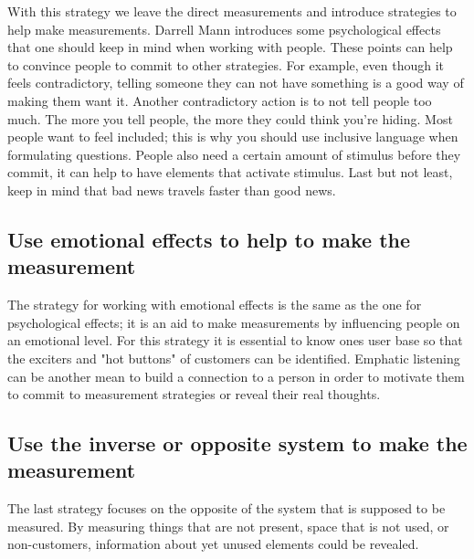 With this strategy we leave the direct measurements and introduce strategies to help make measurements.
Darrell Mann introduces some psychological effects that one should keep in mind when working with people.
These points can help to convince people to commit to other strategies.
For example, even though it feels contradictory, telling someone they can not have something is a good way of making them want it.
Another contradictory action is to not tell people too much.
The more you tell people, the more they could think you're hiding.
Most people want to feel included; this is why you should use inclusive language when formulating questions.
People also need a certain amount of stimulus before they commit, it can help to have elements that activate stimulus.
Last but not least, keep in mind that bad news travels faster than good news.


\subsection[Emotional effects]{Use emotional effects to help to make the measurement}

The strategy for working with emotional effects is the same as the one for psychological effects; it is an aid to make measurements by influencing people on an emotional level.
For this strategy it is essential to know ones user base so that the exciters and "hot buttons" of customers can be identified.
Emphatic listening can be another mean to build a connection to a person in order to motivate them to commit to measurement strategies or reveal their real thoughts. 


\subsection[Measure the opposite]{Use the inverse or opposite system to make the measurement}

The last strategy focuses on the opposite of the system that is supposed to be measured.
By measuring things that are not present, space that is not used, or non-customers, information about yet unused elements could be revealed.



